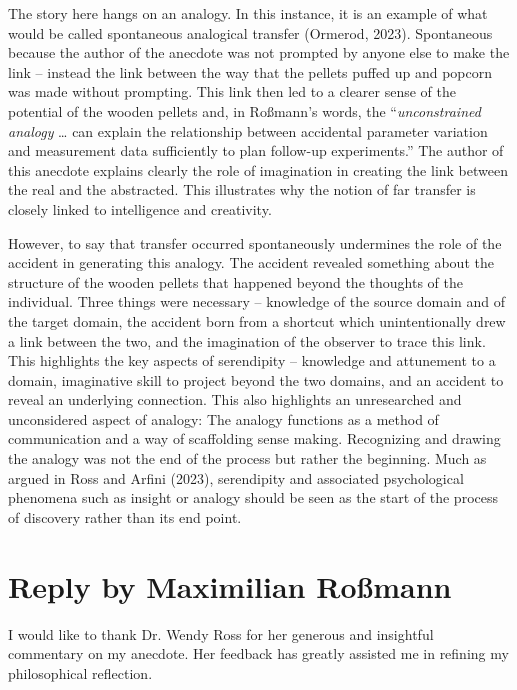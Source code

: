 \documentclass[authordate, commentary]{jote-new-article}
\begin{document}
	The story here hangs on an analogy. In this instance, it is an example of what would be called spontaneous analogical transfer (Ormerod, 2023). Spontaneous because the author of the anecdote was not prompted by anyone else to make the link -- instead the link between the way that the pellets puffed up and popcorn was made without prompting. This link then led to a clearer sense of the potential of the wooden pellets and, in Roßmann's words, the “\emph{unconstrained analogy }… can explain the relationship between accidental parameter variation and measurement data sufficiently to plan follow-up experiments.” The author of this anecdote explains clearly the role of imagination in creating the link between the real and the abstracted. This illustrates why the notion of far transfer is closely linked to intelligence and creativity.



	However, to say that transfer occurred spontaneously undermines the role of the accident in generating this analogy. The accident revealed something about the structure of the wooden pellets that happened beyond the thoughts of the individual. Three things were necessary -- knowledge of the source domain and of the target domain, the accident born from a shortcut which unintentionally drew a link between the two, and the imagination of the observer to trace this link. This highlights the key aspects of serendipity -- knowledge and attunement to a domain, imaginative skill to project beyond the two domains, and an accident to reveal an underlying connection. This also highlights an unresearched and unconsidered aspect of analogy: The analogy functions as a method of communication and a way of scaffolding sense making. Recognizing and drawing the analogy was not the end of the process but rather the beginning. Much as argued in Ross and Arfini (2023), serendipity and associated psychological phenomena such as insight or analogy should be seen as the start of the process of discovery rather than its end point.



	\section{Reply by Maximilian Roßmann}



	I would like to thank Dr. Wendy Ross for her generous and insightful commentary on my anecdote. Her feedback has greatly assisted me in refining my philosophical reflection.
\end{document}

